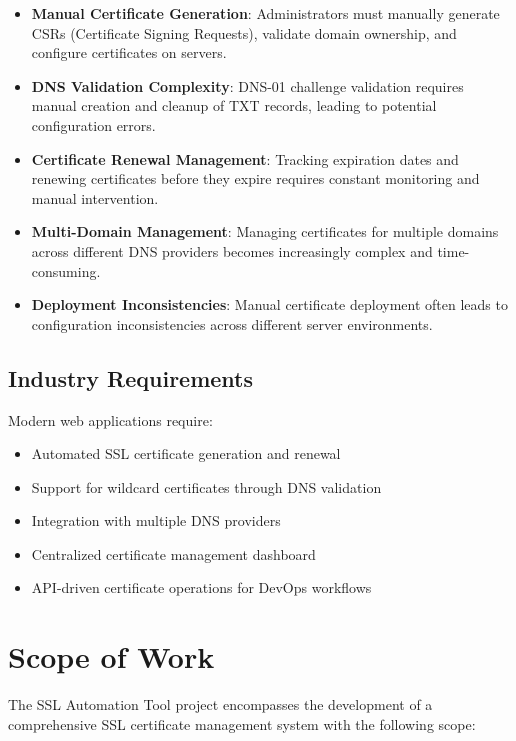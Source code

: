 \begin{itemize}
    \item \textbf{Manual Certificate Generation}: Administrators must manually generate CSRs (Certificate Signing Requests), validate domain ownership, and configure certificates on servers.
    
    \item \textbf{DNS Validation Complexity}: DNS-01 challenge validation requires manual creation and cleanup of TXT records, leading to potential configuration errors.
    
    \item \textbf{Certificate Renewal Management}: Tracking expiration dates and renewing certificates before they expire requires constant monitoring and manual intervention.
    
    \item \textbf{Multi-Domain Management}: Managing certificates for multiple domains across different DNS providers becomes increasingly complex and time-consuming.
    
    \item \textbf{Deployment Inconsistencies}: Manual certificate deployment often leads to configuration inconsistencies across different server environments.
\end{itemize}

\subsection{Industry Requirements}

Modern web applications require:
\begin{itemize}
    \item Automated SSL certificate generation and renewal
    \item Support for wildcard certificates through DNS validation
    \item Integration with multiple DNS providers
    \item Centralized certificate management dashboard
    \item API-driven certificate operations for DevOps workflows
\end{itemize}

\section{Scope of Work}

The SSL Automation Tool project encompasses the development of a comprehensive SSL certificate management system with the following scope:


